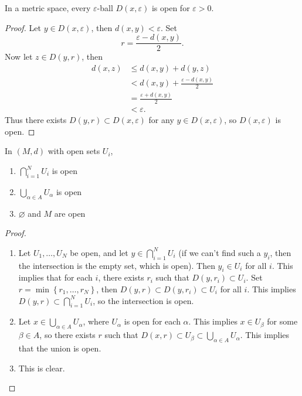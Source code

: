 \documentclass[10pt]{report}
\begin{document}
\begin{prop}
	In a metric space, every $\varepsilon$-ball $D(x,\varepsilon)$ is open for $\varepsilon>0$.
\end{prop}
\begin{proof}
	Let $y \in D(x,\varepsilon)$, then $d(x,y)<\varepsilon$. Set
	 \[
		 r= \frac{\varepsilon-d(x,y)}{2}.
	\] 
	Now let $z \in D(y,r)$, then
	 \begin{align*}
		 d(x,z) &\leq d(x,y) + d(y,z) \\
			&< d(x,y) + \frac{\varepsilon-d(x,y)}{2} \\
			&= \frac{\varepsilon+d(x,y)}{2} \\
			&< \varepsilon.
	\end{align*}
	Thus there exists $D(y,r) \subset D(x,\varepsilon)$ for any $y \in D(x,\varepsilon)$, so $D(x,\varepsilon)$ is open.
\end{proof}

\begin{prop}
	In $(M,d)$ with open sets $U_i$,
	\begin{enumerate}
		\item $\bigcap_{i=1}^N U_i$ is open
		\item $\bigcup_{\alpha \in A} U_\alpha$ is open
		\item $\varnothing$ and $M$ are open
	\end{enumerate}
\end{prop}
\begin{proof}
	\begin{enumerate}
		\item Let $U_1, \dots, U_N$ be open, and let $y \in \bigcap_{i=1}^N U_i$ (if we can't find such a $y_i$, then the intersection is the empty set, which is open). Then $y_i \in U_i$ for all $i$. This implies that for each $i$, there exists $r_i$ such that $D(y,r_i) \subset U_i$. Set $r=\min\left\{ r_1,\dots,r_N \right\}$, then $D(y,r) \subset D(y,r_i) \subset U_i$ for all $i$. This implies $D(y,r) \subset \bigcap_{i=1}^N U_i$, so the intersection is open.

		\item 
			Let $x \in \bigcup_{\alpha\in A}U_\alpha$, where $U_\alpha$ is open for each $\alpha$. This implies $x \in U_\beta$ for some $\beta \in A$, so there exists $r$ such that $D(x,r) \subset U_\beta \subset \bigcup_{\alpha\in A}U_\alpha$. This implies that the union is open.

		\item This is clear.
	\end{enumerate}
\end{proof}
\end{document}
